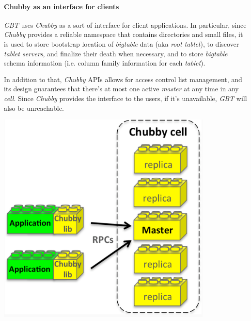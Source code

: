 \noindent\begin{minipage}[c]{0.7\textwidth}
\paragraph{Chubby as an interface for clients}
\emph{GBT} uses \emph{Chubby} as a sort of interface for client applications.
In particular, since \emph{Chubby} provides a reliable namespace that contains
directories and small files, it is used to store bootstrap location of
\emph{bigtable} data (aka \emph{root tablet}), to discover \emph{tablet servers},
and finalize their death when necessary, and to store \emph{bigtable} schema
information (i.e. column family information for each \emph{tablet}).

In addition to that, \emph{Chubby} APIs allows for access control list management,
and its design guarantees that there's at most one active \emph{master} at any
time in any \emph{cell}. Since \emph{Chubby} provides the interface to the users,
if it's unavailable, \emph{GBT} will also be unreachable.
\end{minipage}\hfill
\begin{minipage}[c]{0.28\textwidth}
    \centering
    \includegraphics[width=\textwidth]{images/gbt-chubby-1.png}
\end{minipage}


